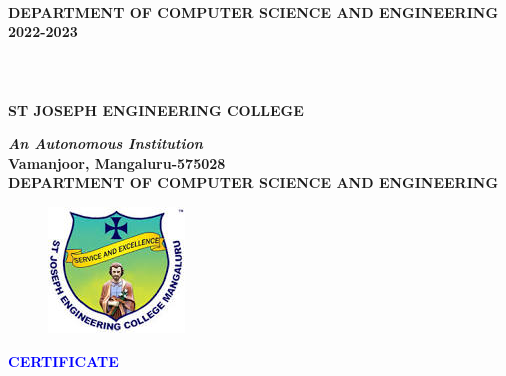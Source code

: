 \documentclass[12pt, letter paper]{report}
\begin{document}
\vspace{0.5cm}
\begin{center}
\large\textbf{\\ DEPARTMENT OF COMPUTER SCIENCE AND ENGINEERING\\ 2022-2023}

\end{center}
\vspace{2cm}
\thispagestyle{empty}
\section*{}
\begin{center}
\Large\textbf{\\ ST JOSEPH ENGINEERING COLLEGE}\\
\end{center}
\begin{center}
\textbf{\textit{An Autonomous Institution}}\\

\large \textbf{Vamanjoor, Mangaluru-575028}\\
\large \textbf{ DEPARTMENT OF COMPUTER SCIENCE AND ENGINEERING} 
\end{center}
\vspace{0.1cm}
\begin{center}
\begin{figure}[h]
 \centering
 \includegraphics[scale=0.7]{sjec.jpeg}
 \label{sjeclogo}
\end{figure}
\end{center}
\vspace{-1cm}
\begin{center}
\large\textbf{\textcolor{blue}{CERTIFICATE}}
\end{center}
\begin{center}
\end{center}
\begin{center}
\end{center}
\begin{center}
\end{center}
\end{document}
